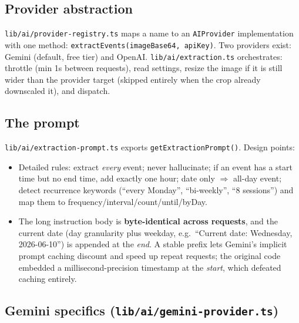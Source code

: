 \documentclass[11pt]{article}
\begin{document}
\subsection{Provider abstraction}

\texttt{lib/ai/provider-registry.ts} maps a name to an \texttt{AIProvider}
implementation with one method: \texttt{extractEvents(imageBase64, apiKey)}.
Two providers exist: Gemini (default, free tier) and OpenAI.
\texttt{lib/ai/extraction.ts} orchestrates: throttle (min 1s between
requests), read settings, resize the image if it is still wider than the
provider target (skipped entirely when the crop already downscaled it), and
dispatch.

\subsection{The prompt}

\texttt{lib/ai/extraction-prompt.ts} exports
\texttt{getExtractionPrompt()}. Design points:

\begin{itemize}
  \item Detailed rules: extract \emph{every} event; never hallucinate; if an
        event has a start time but no end time, add exactly one hour; date
        only $\Rightarrow$ all-day event; detect recurrence keywords
        (``every Monday'', ``bi-weekly'', ``8 sessions'') and map them to
        frequency/interval/count/until/byDay.
  \item The long instruction body is \textbf{byte-identical across requests},
        and the current date (day granularity plus weekday, e.g.\ ``Current
        date: Wednesday, 2026-06-10'') is appended at the \emph{end}. A
        stable prefix lets Gemini's implicit prompt caching discount and
        speed up repeat requests; the original code embedded a
        millisecond-precision timestamp at the \emph{start}, which defeated
        caching entirely.
\end{itemize}

\subsection{Gemini specifics (\texttt{lib/ai/gemini-provider.ts})}
\end{document}

